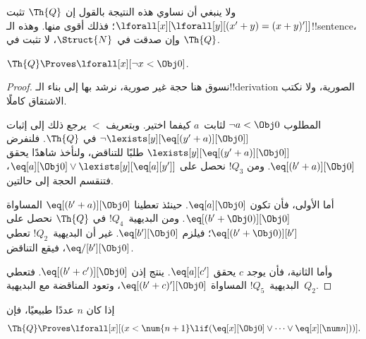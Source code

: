 \documentclass[../../../include/open-logic-section]{subfiles}
\begin{document}
ولا ينبغي أن نساوي هذه النتيجة بالقول إن $\Th{Q}$ تثبت
$\lforall[x][\lforall[y][(x'+y)=(x+y)']]$؛ فذلك أقوى منها.
وهذه الـ!!{sentence}، وإن صدقت في~$\Struct{N}$،
لا تثبت في $\Th{Q}$.

\begin{lem}
$\Th{Q} \Proves \lforall[x][\lnot x < \Obj 0]$.
\end{lem}

\begin{proof}
نسوق هنا حجة غير صورية، نرشد بها إلى بناء الـ!!{derivation} الصورية،
ولا نكتب الاشتقاق كاملًا.

المطلوب $\lnot a<\Obj 0$ لثابت~$a$ كيفما اختير.
وبتعريف $<$ يرجع ذلك إلى إثبات
$\lnot\lexists[y][\eq[(y'+a)][\Obj 0]]$ في $\Th{Q}$.
فلنفرض $\lexists[y][\eq[(y'+a)][\Obj 0]]$ طلبًا للتناقض،
ولنأخذ شاهدًا يحقق $\eq[(b'+a)][\Obj 0]$.
ومن $!Q_3$ نحصل على
$\eq[a][\Obj 0]\lor\lexists[y][\eq[a][y']]$، فتنقسم الحجة إلى حالتين.

أما الأولى، فأن تكون $\eq[a][\Obj 0]$.
حينئذ تعطينا $\eq[(b'+a)][\Obj 0]$ المساواة
$\eq[(b'+\Obj 0)][\Obj 0]$.
ومن البديهية~$!Q_4$ في $\Th{Q}$ نحصل على
$\eq[(b'+\Obj 0)][b']$؛ فيلزم $\eq[b'][\Obj 0]$.
غير أن البديهية~$!Q_2$ تعطي $\eq/[b'][\Obj 0]$، فيقع التناقض.

وأما الثانية، فأن يوجد $c$ يحقق $\eq[a][c']$.
ينتج إذن $\eq[(b'+c')][\Obj 0]$.
فتعطي البديهية~$!Q_5$ المساواة
$\eq[(b'+c)'][\Obj 0]$، وتعود المناقضة مع البديهية~$Q_2$.
\end{proof}

\begin{lem}
إذا كان $n$ عددًا طبيعيًا، فإن
  \[
  \Th{Q} \Proves
  \lforall[x][(x < \num {n+1} \lif (\eq[x][\Obj 0] \lor \dots \lor
    \eq[x][\num n]))].
  \]
\end{lem}
\end{document}
